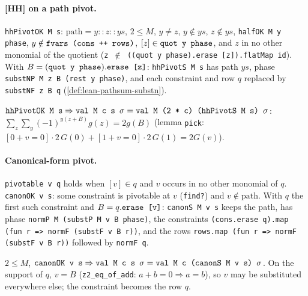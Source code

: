 \paragraph{[HH] on a path pivot.} \textnormal{\texttt{hhPivotOK M s}}: $\text{path} = y :: z :: ys$, $2\le M$,
$y\ne z$, $y\notin ys$, $z\notin ys$, \textnormal{\texttt{halfOK M y phase}}, $y\notin\textnormal{\texttt{fvars (\allowbreak{}cons ++ rows)}}$,
$[z]\in\textnormal{\texttt{quot y phase}}$, and $z$ in no other monomial of the quotient
(\textnormal{\texttt{z \ensuremath{\notin} (\allowbreak{}(\allowbreak{}quot y phase).\allowbreak{}erase [z]).\allowbreak{}flatMap id}}). With $B = (\textnormal{\texttt{quot y phase}}).\textnormal{\texttt{erase [z]}}$:
\textnormal{\texttt{hhPivotS M s}} has path $ys$, phase \textnormal{\texttt{substNP M z B (\allowbreak{}rest y phase)}}, and each
constraint and row $q$ replaced by \textnormal{\texttt{substNF z B q}} (\cref{def:lean-pathsum-substn}).
\begin{theorem}
$\textnormal{\texttt{hhPivotOK M s}}\Rightarrow\textnormal{\texttt{val M c s \ensuremath{\sigma}}} = \textnormal{\texttt{val M (\allowbreak{}2 * c) (\allowbreak{}hhPivotS M s) \ensuremath{\sigma}}}$:
$\sum_z\sum_y(-1)^{y(z+B)}g(z) = 2g(B)$ (lemma \textnormal{\texttt{pick}}:
$[0+v=0]\cdot2\,G(0)+[1+v=0]\cdot 2\,G(1) = 2G(v)$).
\end{theorem}

\paragraph{Canonical-form pivot.} \textnormal{\texttt{pivotable v q}} holds when $[v]\in q$ and $v$ occurs in no
other monomial of $q$. \textnormal{\texttt{canonOK v s}}: some constraint is pivotable at $v$ (\textnormal{\texttt{find?}}) and
$v\notin\text{path}$. With $q$ the first such constraint and $B = q.\textnormal{\texttt{erase [v]}}$:
\textnormal{\texttt{canonS M v s}} keeps the path, has phase \textnormal{\texttt{normP M (\allowbreak{}substP M v B phase)}}, the
constraints \textnormal{\texttt{(\allowbreak{}cons.\allowbreak{}erase q).\allowbreak{}map (\allowbreak{}fun r => normF (\allowbreak{}substF v B r))}}, and the rows
\textnormal{\texttt{rows.\allowbreak{}map (\allowbreak{}fun r => normF (\allowbreak{}substF v B r))}} followed by \textnormal{\texttt{normF q}}.
\begin{theorem}
$2\le M$, $\textnormal{\texttt{canonOK v s}}\Rightarrow\textnormal{\texttt{val M c s \ensuremath{\sigma}}} = \textnormal{\texttt{val M c (\allowbreak{}canonS M v s) \ensuremath{\sigma}}}$.
On the support of $q$, $v = B$ (\textnormal{\texttt{z2\_\allowbreak{}eq\_\allowbreak{}of\_\allowbreak{}add}}: $a+b=0\Rightarrow a=b$), so $v$ may be
substituted everywhere else; the constraint becomes the row $q$.
\end{theorem}

